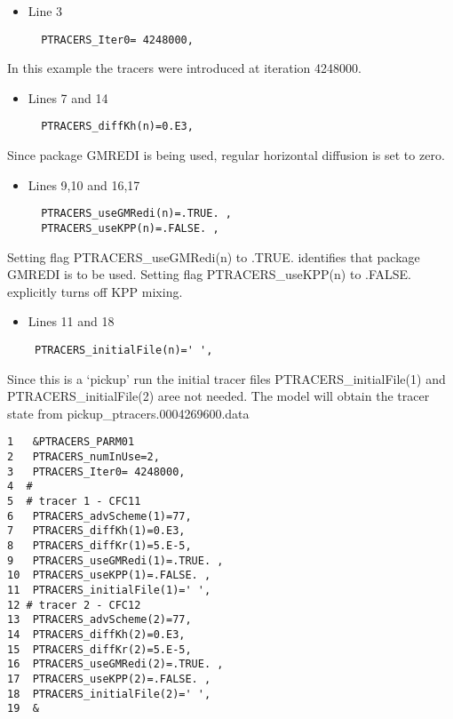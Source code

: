 \begin{itemize}
\item Line 3
\begin {verbatim}
  PTRACERS_Iter0= 4248000,
\end{verbatim}
\end{itemize}

\noindent In this example the tracers were introduced at iteration
4248000.

\begin{itemize}
\item Lines 7 and 14
\begin {verbatim}
  PTRACERS_diffKh(n)=0.E3,
\end{verbatim}
\end{itemize}

\noindent Since package GMREDI is being used, regular horizontal
diffusion is set to zero.

\begin{itemize}
\item Lines 9,10 and 16,17
\begin {verbatim}
  PTRACERS_useGMRedi(n)=.TRUE. ,
  PTRACERS_useKPP(n)=.FALSE. ,
 \end{verbatim}
\end{itemize}

\noindent Setting flag PTRACERS\_useGMRedi(n) to .TRUE. identifies
that package GMREDI is to be used. Setting flag PTRACERS\_useKPP(n) to
.FALSE. explicitly turns off KPP mixing.

\begin{itemize}
\item Lines 11 and 18
\begin {verbatim}
 PTRACERS_initialFile(n)=' ',
 \end{verbatim}
\end{itemize}

\noindent Since this is a `pickup' run the initial tracer files
PTRACERS\_initialFile(1) and PTRACERS\_initialFile(2) aree not needed.
The model will obtain the tracer state from
pickup\_ptracers.0004269600.data

\begin {verbatim}
1   &PTRACERS_PARM01
2   PTRACERS_numInUse=2,
3   PTRACERS_Iter0= 4248000,
4  #
5  # tracer 1 - CFC11
6   PTRACERS_advScheme(1)=77,
7   PTRACERS_diffKh(1)=0.E3,
8   PTRACERS_diffKr(1)=5.E-5,
9   PTRACERS_useGMRedi(1)=.TRUE. ,
10  PTRACERS_useKPP(1)=.FALSE. ,
11  PTRACERS_initialFile(1)=' ',
12 # tracer 2 - CFC12
13  PTRACERS_advScheme(2)=77,
14  PTRACERS_diffKh(2)=0.E3,
15  PTRACERS_diffKr(2)=5.E-5,
16  PTRACERS_useGMRedi(2)=.TRUE. ,
17  PTRACERS_useKPP(2)=.FALSE. ,
18  PTRACERS_initialFile(2)=' ',
19  &
\end{verbatim}


